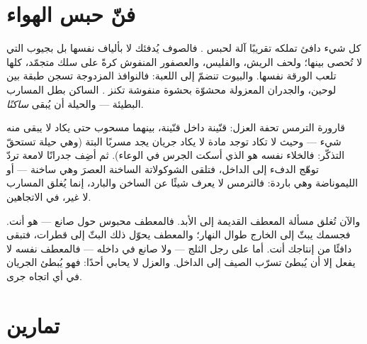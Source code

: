 \section{فنّ حبس الهواء}

\begin{example}\label{ex:g5:heat-and-insulation:air}
كل شيء دافئ تملكه تقريبًا آلة لحبس . فالصوف يُدفئك لا
بألياف نفسها بل بجيوب  التي لا تُحصى بينها؛ ولحف الريش،
والفليس، والعصفور المنفوش كرةً على سلك متجمّد، كلها تلعب الورقة
نفسها. والبيوت تنضمّ إلى اللعبة: فالنوافذ المزدوجة تسجن طبقة
 بين لوحين، والجدران المعزولة محشوّة بحشوة منفوشة تكنز
.  الساكن بطل المسارب البطيئة --- والحيلة أن يُبقى
\emph{ساكنًا}.
\end{example}

\begin{example}[الترمس]\label{ex:g5:heat-and-insulation:thermos}
قارورة الترمس تحفة العزل: قنّينة داخل قنّينة،  بينهما
مسحوب حتى يكاد لا يبقى منه شيء --- وحيث لا تكاد توجد مادة لا
يكاد جريان  يجد مسربًا البتة (وهي حيلة تستحقّ التذكّر:
فالخلاء نفسه هو الذي أسكت الجرس في الوعاء). ثم أضِف جدرانًا
لامعة تردّ توهّج الدفء إلى الداخل، فتلقى الشوكولاتة الساخنة
العصرَ وهي ساخنة --- أو الليموناضة وهي باردة: فالترمس لا يعرف
شيئًا عن الساخن والبارد، إنما يُغلق المسارب لا غير، في
الاتجاهين.
\end{example}

\begin{remark}\label{rem:g5:heat-and-insulation:coat}
والآن تُغلق مسألة المعطف القديمة إلى الأبد. فالمعطف  محبوس
حول صانع  --- هو أنت. فجسمك يبثّ  إلى الخارج طوال
النهار؛ والمعطف يحوّل ذلك البثّ إلى قطرات، فتبقى دافئًا من
إنتاجك أنت. أما على رجل الثلج --- ولا صانع  في داخله ---
فالمعطف نفسه لا يفعل إلا أن يُبطئ تسرّب الصيف إلى الداخل.
والعزل لا يحابي أحدًا: فهو يُبطئ الجريان في أي اتجاه جرى.
\end{remark}

\section{تمارين}

